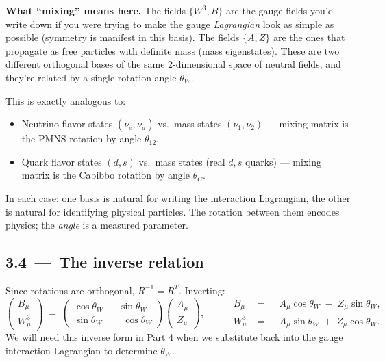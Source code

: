 \documentclass[11pt]{article}
\begin{document}
\begin{conceptbox}
\textbf{What ``mixing'' means here.} The fields $\{W^3, B\}$ are the gauge fields you'd write
down if you were trying to make the gauge \emph{Lagrangian} look as simple as possible
(symmetry is manifest in this basis). The fields $\{A, Z\}$ are the ones that propagate as
free particles with definite mass (mass eigenstates). These are two different orthogonal
bases of the same 2-dimensional space of neutral fields, and they're related by a single
rotation angle $\theta_W$.

This is exactly analogous to:
\begin{itemize}[leftmargin=*]
  \item Neutrino flavor states $(\nu_e, \nu_\mu)$ vs.\ mass states $(\nu_1, \nu_2)$
        --- mixing matrix is the PMNS rotation by angle $\theta_{12}$.
  \item Quark flavor states $(d, s)$ vs.\ mass states (real $d, s$ quarks)
        --- mixing matrix is the Cabibbo rotation by angle $\theta_C$.
\end{itemize}
In each case: one basis is natural for writing the interaction Lagrangian, the other is
natural for identifying physical particles. The rotation between them encodes physics; the
\emph{angle} is a measured parameter.
\end{conceptbox}

\subsection*{3.4 \,---\, The inverse relation}

Since rotations are orthogonal, $R^{-1} = R^T$. Inverting:
\begin{equation}
\begin{pmatrix} B_\mu \\ W^3_\mu \end{pmatrix}
\;=\;
\begin{pmatrix} \cos\theta_W & -\sin\theta_W \\[2pt] \sin\theta_W & \phantom{-}\cos\theta_W \end{pmatrix}
\begin{pmatrix} A_\mu \\ Z_\mu \end{pmatrix},
\qquad
\boxed{\;\;
\begin{aligned}
B_\mu &= \phantom{-}A_\mu\cos\theta_W \;-\; Z_\mu \sin\theta_W, \\
W^3_\mu &= \phantom{-}A_\mu\sin\theta_W \;+\; Z_\mu \cos\theta_W .
\end{aligned}
\;\;}
\end{equation}
We will need this inverse form in Part 4 when we substitute back into the gauge interaction
Lagrangian to determine $\theta_W$.
\end{document}
